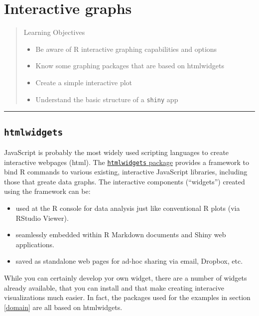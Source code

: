 \documentclass[]{book}
\providecommand{\tightlist}{%
  \setlength{\itemsep}{0pt}\setlength{\parskip}{0pt}}
\theoremstyle{definition}
\theoremstyle{definition}
\theoremstyle{definition}
\theoremstyle{remark}
\begin{document}
\chapter{Interactive graphs}\label{interactive-graphs}

\begin{quote}
Learning Objectives

\begin{itemize}
\tightlist
\item
  Be aware of R interactive graphing capabilities and options
\item
  Know some graphing packages that are based on htmlwidgets
\item
  Create a simple interactive plot
\item
  Understand the basic structure of a \texttt{shiny} app
\end{itemize}
\end{quote}

\begin{center}\rule{0.5\linewidth}{\linethickness}\end{center}

\section{\texorpdfstring{\textbf{\texttt{htmlwidgets}}}{htmlwidgets}}\label{htmlwidgets}

JavaScript is probably the most widely used scripting languages to
create interactive webpages (html). The
\href{(https://CRAN.R-project.org/package=htmlwidgets)}{\texttt{htmlwidgets}
package} provides a framework to bind R commands to various existing,
interactive JavaScript libraries, including those that greate data
graphs. The interactive components (``widgets'') created using the
framework can be:

\begin{itemize}
\tightlist
\item
  used at the R console for data analysis just like conventional R plots
  (via RStudio Viewer).
\item
  seamlessly embedded within R Markdown documents and Shiny web
  applications.
\item
  saved as standalone web pages for ad-hoc sharing via email, Dropbox,
  etc.
\end{itemize}

While you can certainly develop yor own widget, there are a number of
widgets already available, that you can install and that make creating
interacive visualizations much easier. In fact, the packages used for
the examples in section \ref{domain} are all based on htmlwidgets.
\end{document}
